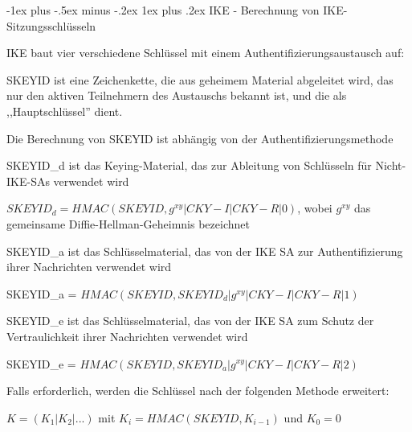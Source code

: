 \documentclass[a4paper]{article}
\makeatletter
\renewcommand{\subsubsection}{\@startsection{subsubsection}{3}{0mm}%
 {-1ex plus -.5ex minus -.2ex}%
 {1ex plus .2ex}%
 {\normalfont\small\bfseries}}
\makeatother
\begin{document}
\begin{multicols}{3}
\begin{itemize*}
            \subsubsection{IKE - Berechnung von
                  IKE-Sitzungsschlüsseln}
            \begin{itemize*}
                  \item IKE baut vier verschiedene Schlüssel mit einem
                  Authentifizierungsaustausch auf:
                  \begin{itemize*}
                        \item SKEYID ist eine Zeichenkette, die aus geheimem Material abgeleitet wird, das nur den aktiven Teilnehmern des Austauschs bekannt ist, und die als ,,Hauptschlüssel'' dient.
                        \begin{itemize*}
                              \item Die Berechnung von SKEYID ist abhängig von der Authentifizierungsmethode
                        \end{itemize*}
                        \item SKEYID\_d ist das Keying-Material, das zur Ableitung von Schlüsseln für Nicht-IKE-SAs verwendet wird
                        \begin{itemize*}
                              \item $SKEYID_d = HMAC(SKEYID, g^{xy} | CKY-I | CKY-R | 0)$, wobei $g^{xy}$ das gemeinsame Diffie-Hellman-Geheimnis bezeichnet
                        \end{itemize*}
                        \item SKEYID\_a ist das Schlüsselmaterial, das von der IKE SA zur Authentifizierung ihrer Nachrichten verwendet wird
                        \begin{itemize*}
                              \item SKEYID\_a = $HMAC(SKEYID, SKEYID_d | g^{xy} | CKY-I | CKY-R | 1)$
                        \end{itemize*}
                        \item SKEYID\_e ist das Schlüsselmaterial, das von der IKE SA zum Schutz der Vertraulichkeit ihrer Nachrichten verwendet wird
                        \begin{itemize*}
                              \item SKEYID\_e = $HMAC(SKEYID, SKEYID_a | g^{xy} | CKY-I | CKY-R | 2)$
                        \end{itemize*}
                  \end{itemize*}
                  \item Falls erforderlich, werden die Schlüssel nach der folgenden Methode
                  erweitert:
                  \begin{itemize*}
                        \item $K=(K_1 | K_2 | ...)$ mit $K_i = HMAC(SKEYID, K_{i-1})$ und $K_0 = 0$
                  \end{itemize*}
            \end{itemize*}


\end{itemize*}
\end{multicols}
\end{document}

